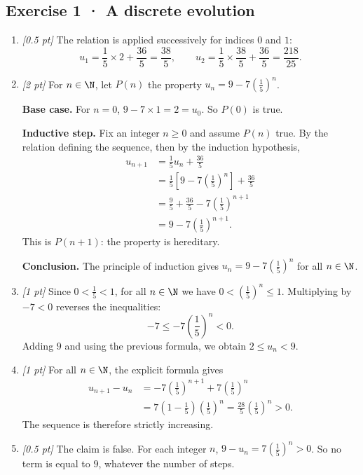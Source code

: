 \subsection*{Exercise 1 · A discrete evolution}\begin{enumerate}

\item \textit{[0.5 pt]} The relation is applied successively for indices $0$ and $1$:\[u_1=\frac{1}{5}\times 2+\frac{36}{5}=\frac{38}{5},\qquad u_2=\frac{1}{5}\times \frac{38}{5}+\frac{36}{5}=\frac{218}{25}.\]

\item \textit{[2 pt]} For $n\in\N$, let $P(n)$ the property $u_n=9-7\left(\frac{1}{5}\right)^n$.
\par\smallskip\textbf{Base case.} For $n=0$, $9-7\times1=2=u_0$. So $P(0)$ is true.
\par\smallskip\textbf{Inductive step.} Fix an integer $n\ge0$ and assume $P(n)$ true. By the relation defining the sequence, then by the induction hypothesis,
\[\begin{aligned}u_{n+1}&=\frac{1}{5}u_n+\frac{36}{5}\\
&=\frac{1}{5}\left[9-7\left(\frac{1}{5}\right)^n\right]+\frac{36}{5}\\
&=\frac{9}{5}+\frac{36}{5}-7\left(\frac{1}{5}\right)^{n+1}\\
&=9-7\left(\frac{1}{5}\right)^{n+1}.
\end{aligned}\]
This is $P(n+1)$: the property is hereditary.
\par\smallskip\textbf{Conclusion.} The principle of induction gives $u_n=9-7\left(\frac{1}{5}\right)^n$ for all $n\in\N$.

\item \textit{[1 pt]} Since $0<\frac{1}{5}<1$, for all $n\in\N$ we have $0<(\frac{1}{5})^n\le1$. Multiplying by $-7<0$ reverses the inequalities:
\[-7\le-7(\frac{1}{5})^n<0.\]
Adding $9$ and using the previous formula, we obtain $2\le u_n<9$.

\item \textit{[1 pt]} For all $n\in\N$, the explicit formula gives
\[\begin{aligned}u_{n+1}-u_n&=-7(\frac{1}{5})^{n+1}+7(\frac{1}{5})^n\\&=7(1-\frac{1}{5})(\frac{1}{5})^n=\frac{28}{5}(\frac{1}{5})^n>0.\end{aligned}\]
The sequence is therefore strictly increasing.

\item \textit{[0.5 pt]} The claim is false. For each integer $n$, $9-u_n=7(\frac{1}{5})^n>0$. So no term is equal to $9$, whatever the number of steps.

\end{enumerate}

